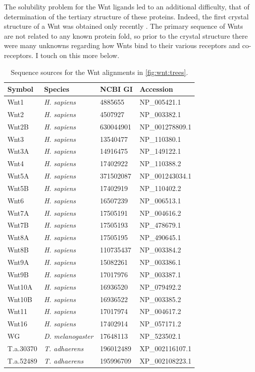 The solubility problem for the Wnt ligands led to an additional difficulty,
that of determination of the tertiary structure of these proteins. Indeed, the first 
crystal structure of a Wnt was obtained only recently \cite{Janda2012}. The
primary sequence of Wnts are not related to any known protein fold, so prior
to the crystal structure there were many unknowns regarding how Wnts bind
to their various receptors and co-receptors. I touch on this more below.


    \begin{table}[!bt]
    \centering
	\footnotesize
    \caption[List of Wnt ligands]
            { Sequence sources for the 
              Wnt alignments in \autoref{fig:wnt:trees}. }
    \label{table:pathways:methods:wnt}
    \begin{tabular}{llll}
    \hline
    Symbol    & Species & NCBI GI & Accession \\ \hline
	Wnt1   & \textit{H. sapiens} & 4885655   & NP\_005421.1    \\
	Wnt2   & \textit{H. sapiens} & 4507927   & NP\_003382.1    \\
	Wnt2B  & \textit{H. sapiens} & 630044901 & NP\_001278809.1 \\
	Wnt3   & \textit{H. sapiens} & 13540477  & NP\_110380.1    \\
	Wnt3A  & \textit{H. sapiens} & 14916475  & NP\_149122.1    \\
	Wnt4   & \textit{H. sapiens} & 17402922  & NP\_110388.2    \\
	Wnt5A  & \textit{H. sapiens} & 371502087 & NP\_001243034.1 \\
	Wnt5B  & \textit{H. sapiens} & 17402919  & NP\_110402.2    \\
	Wnt6   & \textit{H. sapiens} & 16507239  & NP\_006513.1    \\
	Wnt7A  & \textit{H. sapiens} & 17505191  & NP\_004616.2    \\
	Wnt7B  & \textit{H. sapiens} & 17505193  & NP\_478679.1    \\
	Wnt8A  & \textit{H. sapiens} & 17505195  & NP\_490645.1    \\
	Wnt8B  & \textit{H. sapiens} & 110735437 & NP\_003384.2    \\
	Wnt9A  & \textit{H. sapiens} & 15082261  & NP\_003386.1    \\
	Wnt9B  & \textit{H. sapiens} & 17017976  & NP\_003387.1    \\
	Wnt10A & \textit{H. sapiens} & 16936520  & NP\_079492.2    \\
	Wnt10B & \textit{H. sapiens} & 16936522  & NP\_003385.2    \\
	Wnt11  & \textit{H. sapiens} & 17017974  & NP\_004617.2    \\
	Wnt16  & \textit{H. sapiens} & 17402914  & NP\_057171.2    \\
	WG     & \textit{D. melanogaster} & 17648113  & NP\_523502.1   \\
	T.a.30370& \textit{T. adhaerens}  & 196012489 & XP\_002116107.1 \\
	T.a.52489& \textit{T. adhaerens}  & 195996709 & XP\_002108223.1 \\ 
    \hline
    \end{tabular}
    \end{table}
